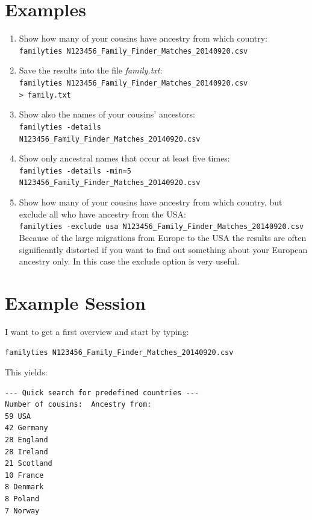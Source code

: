 \documentclass[12pt,a4paper]{article}
\begin{document}
\section{Examples}

\begin{enumerate}
\item Show how many of your cousins have ancestry from which
   country:\\
   \texttt{familyties N123456\_Family\_Finder\_Matches\_20140920.csv}
\item Save the results into the file \emph{family.txt}:\\
   \texttt{familyties N123456\_Family\_Finder\_Matches\_20140920.csv\\ > family.txt}
\item Show also the names of your cousins' ancestors:\\
   \texttt{familyties -details\\ N123456\_Family\_Finder\_Matches\_20140920.csv}
\item Show only ancestral names that occur at least five times:\\
   \texttt{familyties -details -min=5\\ N123456\_Family\_Finder\_Matches\_20140920.csv}
\item Show how many of your cousins have ancestry from which
   country, but exclude all who have ancestry from the USA:\\
   \texttt{familyties -exclude usa N123456\_Family\_Finder\_Matches\_20140920.csv}\\
   Because of the large migrations from Europe to the USA the results
   are often significantly distorted if you want to find out something
   about your European ancestry only. In this case the exclude option
   is very useful.
\end{enumerate}


\section{Example Session}

I want to get a first overview and start by typing:

\vspace{1em}
\noindent\texttt{familyties N123456\_Family\_Finder\_Matches\_20140920.csv}

\vspace{1em}
\noindent This yields:

\begin{verbatim}
--- Quick search for predefined countries ---
Number of cousins:  Ancestry from:
59 USA
42 Germany
28 England
28 Ireland
21 Scotland
10 France
8 Denmark
8 Poland
7 Norway
\end{verbatim}
\end{document}
